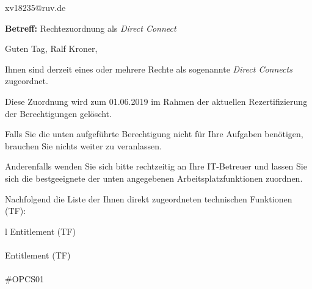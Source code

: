 \documentclass[a4paper,landscape,12pt]{letter}
\begin{document}
\begin{letter}{xv18235@ruv.de\hfill \break}
\begin{normalsize}
	\opening{\textbf{Betreff:} Rechtezuordnung als \emph{Direct Connect}}
	\begin{normalsize} \hfill
	\end{normalsize}

	\begin{normalsize}
		Guten Tag, 
	Ralf Kroner, \hfill \break
	\end{normalsize}
	\end{normalsize}
	
\begin{normalsize}
	Ihnen sind derzeit eines oder mehrere Rechte als sogenannte \emph{Direct Connects} zugeordnet.
	
	Diese Zuordnung wird zum 01.06.2019 im Rahmen der aktuellen Rezertifizierung der Berechtigungen gelöscht.
	
	Falls Sie die unten aufgeführte Berechtigung nicht für Ihre Aufgaben benötigen, 
	brauchen Sie nichts weiter zu veranlassen.
	
	Anderenfalls wenden Sie sich bitte rechtzeitig an Ihre IT-Betreuer 
	und lassen Sie sich die bestgeeignete der unten angegebenen Arbeitsplatzfunktionen zuordnen.
	\end{normalsize}
	
\begin{normalsize}
	Nachfolgend die Liste der Ihnen direkt zugeordneten technischen Funktionen (TF):

	\begin{longtable}{l}
		Entitlement (TF) \\ \hline
		\endfirsthead
		\\\hline
		Entitlement (TF) \\ \hline
		\endhead %
		\multicolumn{1}{r@{}}{Fortsetzung \ldots}\\
		\endfoot
		\hline
		\endlastfoot
	\#OPCS01\\
	\end{longtable}
	\end{normalsize}
	

\end{letter}
\end{document}
